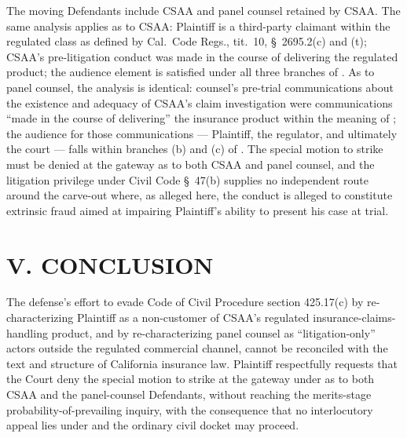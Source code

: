 The moving Defendants include CSAA and panel counsel retained by CSAA. The same analysis applies as to CSAA: Plaintiff is a third-party claimant within the regulated class as defined by Cal.\ Code Regs., tit.\ 10, \S~2695.2(c) and (t); CSAA's pre-litigation conduct was made in the course of delivering the regulated product; the audience element is satisfied under all three branches of . As to panel counsel, the analysis is identical: counsel's pre-trial communications about the existence and adequacy of CSAA's claim investigation were communications ``made in the course of delivering'' the insurance product within the meaning of ; the audience for those communications --- Plaintiff, the regulator, and ultimately the court --- falls within branches (b) and (c) of . The special motion to strike must be denied at the gateway as to both CSAA and panel counsel, and the litigation privilege under Civil Code \S~47(b) supplies no independent route around the carve-out where, as alleged here, the conduct is alleged to constitute extrinsic fraud aimed at impairing Plaintiff's ability to present his case at trial.

\section*{V. CONCLUSION}

The defense's effort to evade Code of Civil Procedure section 425.17(c) by re-characterizing Plaintiff as a non-customer of CSAA's regulated insurance-claims-handling product, and by re-characterizing panel counsel as ``litigation-only'' actors outside the regulated commercial channel, cannot be reconciled with the text and structure of California insurance law. Plaintiff respectfully requests that the Court deny the special motion to strike at the gateway under  as to both CSAA and the panel-counsel Defendants, without reaching the merits-stage probability-of-prevailing inquiry, with the consequence that no interlocutory appeal lies under  and the ordinary civil docket may proceed.




